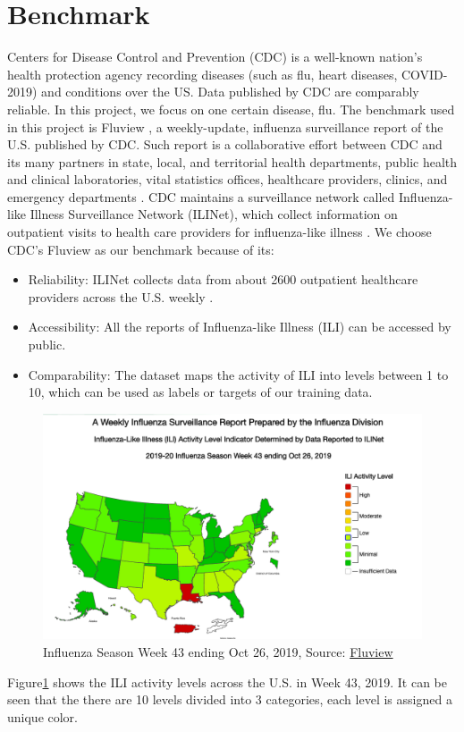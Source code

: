 \section{Benchmark} 
Centers for Disease Control and Prevention (CDC)\cite{cdc.gov} is a well-known nation's health protection agency recording diseases (such as flu, heart diseases, COVID-2019) and conditions over the US. Data published by CDC are comparably reliable. In this project, we focus on one certain disease, flu. The benchmark used in this project is Fluview \cite{cdc:fluView}, a weekly-update, influenza surveillance report of the U.S. published by CDC. Such report is a collaborative effort between CDC and its many partners in state, local, and territorial health departments, public health and clinical laboratories, vital statistics offices, healthcare providers, clinics, and emergency departments \cite{cdc.gov}. CDC maintains a surveillance network called Influenza-like Illness Surveillance Network (ILINet), which collect information on outpatient visits to health care providers for influenza-like illness \cite{cdc.gov}. We choose CDC's Fluview as our benchmark because of its:
\begin{itemize}
    \item Reliability: ILINet collects data from about 2600 outpatient healthcare providers across the U.S. weekly \cite{cdc.gov}.
    \item Accessibility: All the reports of Influenza-like Illness (ILI) can be accessed by public.
    \item Comparability: The dataset maps the activity of ILI into levels between 1 to 10, which can be used as labels or targets of our training data.
\end{itemize}
\begin{figure}[!htbp]
   \center
   \includegraphics[width=6in]{images/week43.png}
   \caption{Influenza Season Week 43 ending Oct 26, 2019, Source: \href{https://www.cdc.gov/flu/weekly/index.htm\#ILIActivityMap}{Fluview}}
   \label{fig:fluView}
\end{figure}
Figure\ref{fig:fluView} shows the ILI activity levels across the U.S. in Week 43, 2019. It can be seen that the there are 10 levels divided into 3 categories, each level is assigned a unique color.

